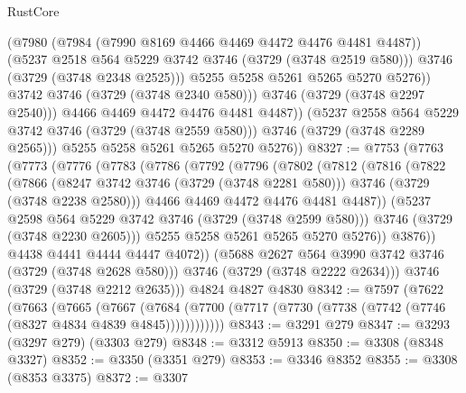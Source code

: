 \begin{lexlean}{RustCore}
\begin{coremodule}
                      (@7980
                        (@7984 (@7990 @8169 @4466 @4469 @4472 @4476 @4481 @4487))
                        (@5237 @2518 @564 @5229 @3742 @3746 (@3729 (@3748 @2519 @580)))
                        @3746
                        (@3729 (@3748 @2348 @2525)))
                      @5255
                      @5258
                      @5261
                      @5265
                      @5270
                      @5276))
                  @3742
                  @3746
                  (@3729 (@3748 @2340 @580)))
                @3746
                (@3729 (@3748 @2297 @2540)))
              @4466
              @4469
              @4472
              @4476
              @4481
              @4487))
          (@5237 @2558 @564 @5229 @3742 @3746 (@3729 (@3748 @2559 @580)))
          @3746
          (@3729 (@3748 @2289 @2565)))
        @5255
        @5258
        @5261
        @5265
        @5270
        @5276))
@8327 := @7753
    (@7763
      (@7773
        (@7776
          (@7783
            (@7786
              (@7792
                (@7796
                  (@7802
                    (@7812
                      (@7816
                        (@7822
                          (@7866
                            (@8247 @3742 @3746 (@3729 (@3748 @2281 @580)))
                            @3746
                            (@3729 (@3748 @2238 @2580)))
                          @4466
                          @4469
                          @4472
                          @4476
                          @4481
                          @4487))
                      (@5237 @2598 @564 @5229 @3742 @3746 (@3729 (@3748 @2599 @580)))
                      @3746
                      (@3729 (@3748 @2230 @2605)))
                    @5255
                    @5258
                    @5261
                    @5265
                    @5270
                    @5276))
                @3876))
            @4438
            @4441
            @4444
            @4447
            @4072))
        (@5688 @2627 @564 @3990 @3742 @3746 (@3729 (@3748 @2628 @580)))
        @3746
        (@3729 (@3748 @2222 @2634)))
      @3746
      (@3729 (@3748 @2212 @2635)))
    @4824
    @4827
    @4830
@8342 := @7597
    (@7622
      (@7663
        (@7665
          (@7667
            (@7684 (@7700 (@7717 (@7730 (@7738 (@7742 (@7746 (@8327 @4834 @4839 @4845))))))))))))
@8343 := @3291 @279
@8347 := @3293 (@3297 @279) (@3303 @279)
@8348 := @3312 @5913
@8350 := @3308 (@8348 @3327)
@8352 := @3350 (@3351 @279)
@8353 := @3346 @8352
@8355 := @3308 (@8353 @3375)
@8372 := @3307

\end{coremodule}
\end{lexlean}
